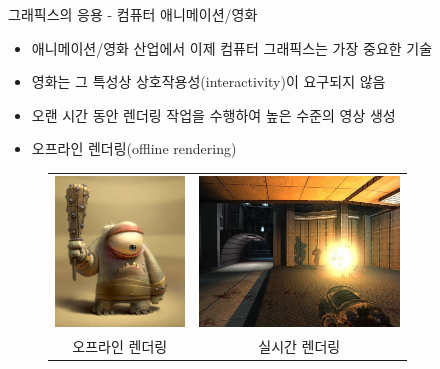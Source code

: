 \documentclass{beamer}
\begin{document}
\begin{frame}{그래픽스의 응용 - 컴퓨터 애니메이션/영화}

\begin{itemize}
\item 애니메이션/영화 산업에서 이제 컴퓨터 그래픽스는 가장 중요한 기술
\item 영화는 그 특성상 상호작용성(interactivity)이 요구되지 않음
\item 오랜 시간 동안 렌더링 작업을 수행하여 높은 수준의 영상 생성
\item 오프라인 렌더링(offline rendering)
\end{itemize}

\begin{figure}
\begin{tabular}{cc}
    \includegraphics[height=4cm]{OGL_intro/animation.jpg}&
    \includegraphics[height=4cm]{OGL_intro/game.jpg}\\
오프라인 렌더링 & 실시간 렌더링
\end{tabular}
\end{figure}


\end{frame}
\end{document}
